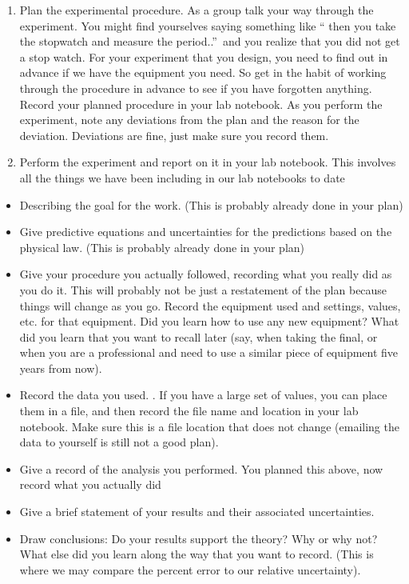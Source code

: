\documentclass{book}
\begin{document}
\begin{enumerate}
\item Plan the experimental procedure. As a group talk your way through the
experiment. You might find yourselves saying something like \textquotedblleft
then you take the stopwatch and measure the period..\textquotedblright\ and
you realize that you did not get a stop watch. For your experiment that you
design, you need to find out in advance if we have the equipment you need. So
get in the habit of working through the procedure in advance to see if you
have forgotten anything. Record your planned procedure in your lab notebook.
As you perform the experiment, note any deviations from the plan and the
reason for the deviation. Deviations are fine, just make sure you record them.

\item Perform the experiment and report on it in your lab notebook. This
involves all the things we have been including in our lab notebooks to date
\end{enumerate}

\begin{itemize}
\item Describing the goal for the work. (This is probably already done in your plan)

\item Give predictive equations and uncertainties for the predictions based on
the physical law. (This is probably already done in your plan)

\item Give your procedure you actually followed, recording what you really did
as you do it. This will probably not be just a restatement of the plan because
things will change as you go. Record the equipment used and settings, values,
etc. for that equipment. Did you learn how to use any new equipment? What did
you learn that you want to recall later (say, when taking the final, or when
you are a professional and need to use a similar piece of equipment five years
from now).

\item Record the data you used. . If you have a large set of values, you can
place them in a file, and then record the file name and location in your lab
notebook. Make sure this is a file location that does not change (emailing the
data to yourself is still not a good plan).

\item Give a record of the analysis you performed. You planned this above, now
record what you actually did

\item Give a brief statement of your results and their associated uncertainties.

\item Draw conclusions: Do your results support the theory? Why or why not?
What else did you learn along the way that you want to record. (This is where
we may compare the percent error to our relative uncertainty).
\end{itemize}
\end{document}
